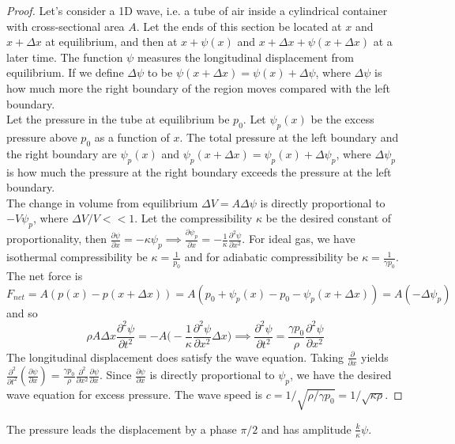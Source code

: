 \documentclass[a4paper]{article}
\begin{document}
\begin{proof}
Let's consider a 1D wave, i.e. a tube of air inside a cylindrical container with cross-sectional area $A$. Let the ends of this section be located at $x$ and $x+\Delta x$ at equilibrium, and then at $x+\psi(x)$ and $x+\Delta x+\psi(x+\Delta x)$ at a later time. The function $\psi$ measures the longitudinal displacement from equilibrium. If we define $\Delta\psi$ to be $\psi(x+\Delta x)=\psi(x)+\Delta\psi$, where $\Delta\psi$ is how much more the right boundary of the region moves compared with the left boundary.\\[5pt]
Let the pressure in the tube at equilibrium be $p_0$. Let $\psi_p(x)$ be the excess pressure above $p_0$ as a function of $x$. The total pressure at the left boundary and the right boundary are $\psi_p(x)$ and $\psi_p(x+\Delta x)=\psi_p(x)+\Delta\psi_p$, where $\Delta\psi_p$ is how much the pressure at the right boundary exceeds the pressure at the left boundary.\\[5pt]
The change in volume from equilibrium $\Delta V=A\Delta\psi$ is directly proportional to $-V\psi_p$, where $\Delta V/V<<1$. Let the compressibility $\kappa$ be the desired constant of proportionality, then $\frac{\partial\psi}{\partial x}=-\kappa\psi_p\implies\frac{\partial\psi_p}{\partial x}=-\frac{1}{\kappa}\frac{\partial^2\psi}{\partial x^2}$. For ideal gas, we have isothermal compressibility be $\kappa=\frac{1}{p_0}$ and for adiabatic compressibility be $\kappa=\frac{1}{\gamma p_0}$.\\[5pt]
The net force is $F_{net}=A(p(x)-p(x+\Delta x))=A(p_0+\psi_p(x)-p_0-\psi_p(x+\Delta x))=A(-\Delta\psi_p)$ and so
$$\rho A\Delta x\frac{\partial^2\psi}{\partial t^2}=-A\bigg(-\frac{1}{\kappa}\frac{\partial^2\psi}{\partial x^2}\Delta x\bigg)\implies\frac{\partial^2\psi}{\partial t^2}=\frac{\gamma p_0}{\rho}\frac{\partial^2\psi}{\partial x^2}$$
The longitudinal displacement does satisfy the wave equation. Taking $\frac{\partial}{\partial x}$ yields $\frac{\partial^2}{\partial t^2}(\frac{\partial\psi}{\partial x})=\frac{\gamma p_0}{\rho}\frac{\partial^2}{\partial x^2}\frac{\partial\psi}{\partial x}$. Since $\frac{\partial\psi}{\partial x}$ is directly proportional to $\psi_p$, we have the desired wave equation for excess pressure. The wave speed is $c=1/\sqrt{\rho/\gamma p_0}=1/\sqrt{\kappa\rho}$.
\end{proof}
\begin{cor}
The pressure leads the displacement by a phase $\pi/2$ and has amplitude $\frac{k}{\kappa}\psi$.
\end{cor}
\end{document}
